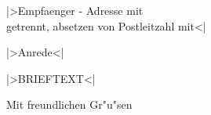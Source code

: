 \documentclass[12pt]{dinbrief}
\begin{document}
\date{|>heutiges Datum, Format Jahr-Monat-Tag<|}
\begin{letter}{|>Empfaenger - Adresse mit \\ getrennt, absetzen von Postleitzahl mit<|
}

\subject{\textbf{|>Betreff, mehrere Zeilen mit \\ <|}}

\opening{|>Anrede<|}


|>BRIEFTEXT<|


\closing{Mit freundlichen Gr"u"sen}




\end{letter}
\end{document}
